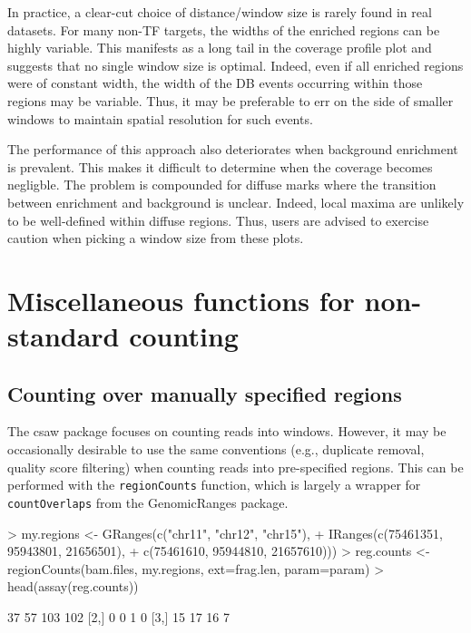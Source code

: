 \documentclass[12pt]{report}
\renewenvironment{Schunk}{\vspace{0pt}}{\vspace{0pt}}
\newcommand{\pkgname}{csaw}
\newcommand{\code}[1]{{\small\texttt{#1}}}
\newcommand{\granges}{GenomicRanges}
\begin{document}
In practice, a clear-cut choice of distance/window size is rarely found in real datasets.
For many non-TF targets, the widths of the enriched regions can be highly variable.
This manifests as a long tail in the coverage profile plot and suggests that no single window size is optimal.
Indeed, even if all enriched regions were of constant width, the width of the DB events occurring within those regions may be variable.
Thus, it may be preferable to err on the side of smaller windows to maintain spatial resolution for such events.

The performance of this approach also deteriorates when background enrichment is prevalent.
This makes it difficult to determine when the coverage becomes negligble.
The problem is compounded for diffuse marks where the transition between enrichment and background is unclear.
Indeed, local maxima are unlikely to be well-defined within diffuse regions.
Thus, users are advised to exercise caution when picking a window size from these plots.

\section{Miscellaneous functions for non-standard counting}

\subsection{Counting over manually specified regions}
The \pkgname{} package focuses on counting reads into windows. 
However, it may be occasionally desirable to use the same conventions (e.g., duplicate removal, quality score filtering) when counting reads into pre-specified regions. 
This can be performed with the \code{regionCounts} function, which is largely a wrapper for \code{countOverlaps} from the \granges{} package.

\begin{Schunk}
\begin{Sinput}
> my.regions <- GRanges(c("chr11", "chr12", "chr15"),
+     IRanges(c(75461351, 95943801, 21656501), 
+     c(75461610, 95944810, 21657610)))
> reg.counts <- regionCounts(bam.files, my.regions, ext=frag.len, param=param)
> head(assay(reg.counts))
\end{Sinput}
\begin{Soutput}
     [,1] [,2] [,3] [,4]
[1,]   37   57  103  102
[2,]    0    0    1    0
[3,]   15   17   16    7
\end{Soutput}
\end{Schunk}
\end{document}
